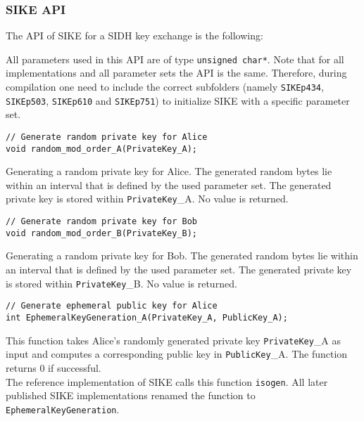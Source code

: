 \subsubsection{\gls{SIKE} API}
The API of \gls{SIKE} for a \gls{SIDH} key exchange is the following:

All parameters used in this API are of type \texttt{unsigned char*}. Note that for all implementations and all parameter sets the API is the same. Therefore, during compilation one need to include the correct subfolders (namely \texttt{SIKEp434}, \texttt{SIKEp503}, \texttt{SIKEp610} and \texttt{SIKEp751}) to initialize \gls{SIKE} with a specific parameter set.


\begin{lstlisting}[]
// Generate random private key for Alice
void random_mod_order_A(PrivateKey_A);
\end{lstlisting}
Generating a random private key for Alice. The generated random bytes lie within an interval that is defined by the used parameter set. The generated private key is stored within \textcolor{keywordcol}{\texttt{PrivateKey}\_A}. No value is returned.\\

\begin{lstlisting}[]
// Generate random private key for Bob
void random_mod_order_B(PrivateKey_B);
\end{lstlisting}
Generating a random private key for Bob. The generated random bytes lie within an interval that is defined by the used parameter set. The generated private key is stored within \textcolor{keywordcol}{\texttt{PrivateKey}\_B}. No value is returned.\\

\begin{lstlisting}[]
// Generate ephemeral public key for Alice
int EphemeralKeyGeneration_A(PrivateKey_A, PublicKey_A);
\end{lstlisting}
This function takes Alice's randomly generated private key \textcolor{keywordcol}{\texttt{PrivateKey}\_A} as input and computes a corresponding public key in \textcolor{keywordcol}{\texttt{PublicKey}\_A}. The function returns 0 if successful.\\
The reference implementation of SIKE calls this function \texttt{isogen}. All later published SIKE implementations renamed the function to \texttt{EphemeralKeyGeneration}.\\

